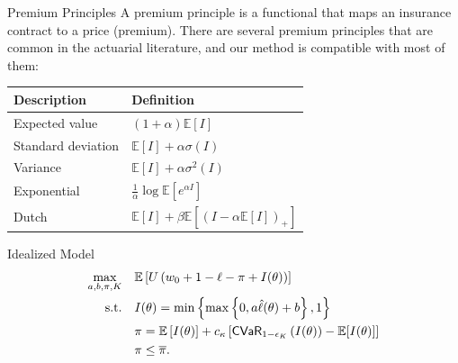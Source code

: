 \documentclass{beamer}
\begin{document}
\begin{frame}{Premium Principles}
    A premium principle is a functional that maps an insurance contract to a price (premium). There are several premium principles that are common in the actuarial literature, and our method is compatible with most of them:
    \begin{table}[h!]
        \centering
        \begin{tabular}{ll}
        Description & Definition \\ \hline
        Expected value       & $(1+\alpha)\mathbb{E}[I]$           \\
        Standard deviation   & $\mathbb{E}[I] + \alpha \sigma(I)$       \\
        Variance             & $\mathbb{E}[I] + \alpha \sigma^2(I)$      \\
        Exponential          & $\frac{1}{\alpha} \log \mathbb{E}[e^{\alpha I}]$    \\
        Dutch                &  $\mathbb{E}[I] + \beta \mathbb{E}[(I-\alpha \mathbb{E}[I])_+]$                   \\ \hline
        \end{tabular}
        \end{table}
\end{frame}


\begin{frame}{Idealized Model}
\begin{align}
    \max_{a,b,\pi, K}  & \quad \mathbb{E} \left [ U\left ( w_0 + 1 - \ell - \pi + I(\theta) \right ) \right ] \label{cons-objective}\\
    \text{s.t.} & \quad I(\theta) =  \min \left \{\max \left \{0,a\hat{\ell}(\theta) + b \right \}, 1 \right \}\label{cons-contract}\\
    & \quad \pi = \mathbb{E}\left [ I(\theta) \right ] + c_{\kappa} \left[ {\sf CVaR}_{1-\epsilon_K}\left ( I(\theta)\right )  - \mathbb{E}[I(\theta)]  \right] \\
    &\quad \pi \leq \overline{\pi}.
\end{align}
\end{frame}
\end{document}
